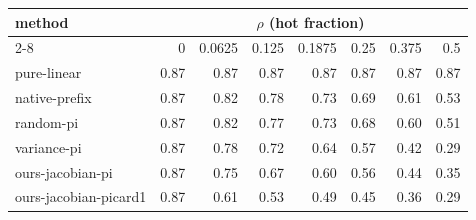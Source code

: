 \begin{tabular}{lrrrrrrr}
\toprule
method & \multicolumn{7}{c}{$\rho$ (hot fraction)} \\
\cmidrule(lr){2-8}
 & 0 & 0.0625 & 0.125 & 0.1875 & 0.25 & 0.375 & 0.5 \\
\midrule
pure-linear & 0.87 & 0.87 & 0.87 & 0.87 & 0.87 & 0.87 & 0.87 \\
native-prefix & 0.87 & 0.82 & 0.78 & 0.73 & 0.69 & 0.61 & 0.53 \\
random-pi & 0.87 & 0.82 & 0.77 & 0.73 & 0.68 & 0.60 & 0.51 \\
variance-pi & 0.87 & 0.78 & 0.72 & 0.64 & 0.57 & 0.42 & 0.29 \\
ours-jacobian-pi & 0.87 & 0.75 & 0.67 & 0.60 & 0.56 & 0.44 & 0.35 \\
ours-jacobian-picard1 & 0.87 & 0.61 & 0.53 & 0.49 & 0.45 & 0.36 & 0.29 \\
\bottomrule
\end{tabular}
